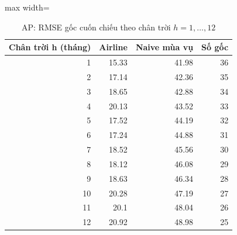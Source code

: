 \begin{table}[H]
\centering\footnotesize
\caption{AP: RMSE gốc cuốn chiếu theo chân trời $h=1,\dots,12$}\label{tab:tab_b12_12_ap_rolling_by_horizon}
\begin{adjustbox}{max width=\linewidth}
\begin{tabular}{|r|r|r|r|}
\toprule
Chân trời h (tháng) & Airline & Naive mùa vụ & Số gốc \\
\midrule
1 & 15.33 & 41.98 & 36 \\
2 & 17.14 & 42.36 & 35 \\
3 & 18.65 & 42.88 & 34 \\
4 & 20.13 & 43.52 & 33 \\
5 & 17.52 & 44.19 & 32 \\
6 & 17.24 & 44.88 & 31 \\
7 & 18.52 & 45.56 & 30 \\
8 & 18.12 & 46.08 & 29 \\
9 & 18.63 & 46.34 & 28 \\
10 & 20.28 & 47.19 & 27 \\
11 & 20.1 & 48.04 & 26 \\
12 & 20.92 & 48.98 & 25 \\
\bottomrule
\end{tabular}
\end{adjustbox}
\end{table}
